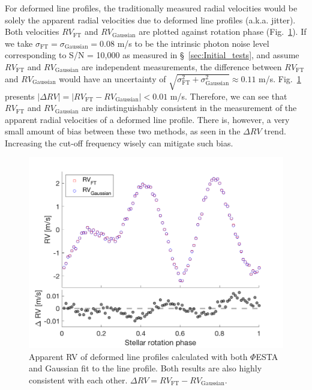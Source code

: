 For deformed line profiles, the traditionally measured radial velocities would be solely the apparent radial velocities due to deformed line profiles (a.k.a. jitter). Both velocities $RV_\text{FT}$ and $RV_\text{Gaussian}$ are plotted against rotation phase (Fig.~\ref{fig:rv_recovery_deformed}). If we take $\sigma_\text{FT} = \sigma_\text{Gaussian} = 0.08$ m/s to be the intrinsic photon noise level corresponding to S/N = 10,000 as measured in \S~\ref{sec:Initial_tests}, and assume $RV_\text{FT}$ and $RV_\text{Gaussian}$ are independent measurements, the difference between $RV_\text{FT}$ and $RV_\text{Gaussian}$ would have an uncertainty of $\sqrt{\sigma_\text{FT}^2+\sigma_\text{Gaussian}^2}\approx0.11$ m/s. Fig.~\ref{fig:rv_recovery_deformed} presents $\mid \Delta RV \mid = \mid RV_\text{FT} - RV_\text{Gaussian}\mid < 0.01$ m/s. Therefore, we can see that $RV_\text{FT}$ and $RV_\text{Gaussian}$ are indistinguishably consistent in the measurement of the apparent radial velocities of a deformed line profile. There is, however, a very small amount of bias between these two methods, as seen in the $\Delta RV$ trend. Increasing the cut-off frequency wisely can mitigate such bias. 

\begin{figure}[tbp]
\centering
\includegraphics[width = 0.7 \linewidth]
{./Figures/Methods/5-JITTER_ONLY_3.png}
\caption[Apparent RV of deformed line profiles]
{Apparent RV of deformed line profiles calculated with both $\mathit{\Phi}$ESTA and Gaussian fit to the line profile. Both results are also highly consistent with each other. $\Delta RV  = RV_\text{FT} - RV_\text{Gaussian}$.}
\label{fig:rv_recovery_deformed}
\end{figure} 
\FloatBarrier

